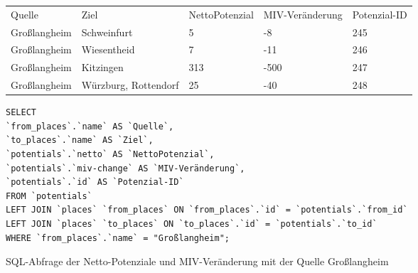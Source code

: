 \begin{tabularx}{\textwidth}{*5{X}}
Quelle & Ziel & NettoPotenzial & MIV-Veränderung & Potenzial-ID\\ 
Großlangheim & Schweinfurt & 5 & -8 & 245\\ 
Großlangheim & Wiesentheid & 7 & -11 & 246\\ 
Großlangheim & Kitzingen & 313 & -500 & 247\\ 
Großlangheim & Würzburg, Rottendorf & 25 & -40 & 248\\ 
\end{tabularx}    
\newline
\newline
\begin{listing}[htbp]
\begin{verbatim}
SELECT
`from_places`.`name` AS `Quelle`, 
`to_places`.`name` AS `Ziel`, 
`potentials`.`netto` AS `NettoPotenzial`, 
`potentials`.`miv-change` AS `MIV-Veränderung`, 
`potentials`.`id` AS `Potenzial-ID`
FROM `potentials`
LEFT JOIN `places` `from_places` ON `from_places`.`id` = `potentials`.`from_id`
LEFT JOIN `places` `to_places` ON `to_places`.`id` = `potentials`.`to_id`
WHERE `from_places`.`name` = "Großlangheim";
\end{verbatim}
\caption{SQL-Abfrage der Netto-Potenziale und MIV-Veränderung mit der Quelle Großlangheim}\label{lst-fz-grosslangheim}
\end{listing}